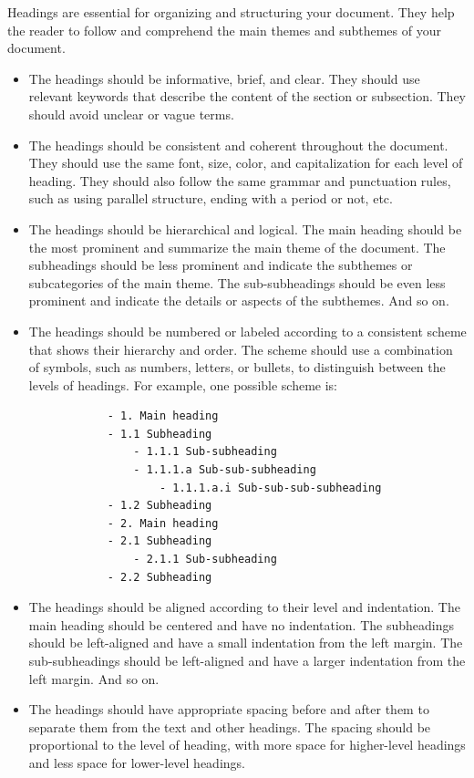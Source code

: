 \documentclass[12pt]{article}
\begin{document}
Headings are essential for organizing and structuring your document. They help the reader to follow and comprehend the main themes and subthemes of your document.

\begin{itemize}
    \item The headings should be informative, brief, and clear. They should use relevant keywords that describe the content of the section or subsection. They should avoid unclear or vague terms.
    \item The headings should be consistent and coherent throughout the document. They should use the same font, size, color, and capitalization for each level of heading. They should also follow the same grammar and punctuation rules, such as using parallel structure, ending with a period or not, etc.
    \item The headings should be hierarchical and logical. The main heading should be the most prominent and summarize the main theme of the document. The subheadings should be less prominent and indicate the subthemes or subcategories of the main theme. The sub-subheadings should be even less prominent and indicate the details or aspects of the subthemes. And so on.
    \item The headings should be numbered or labeled according to a consistent scheme that shows their hierarchy and order. The scheme should use a combination of symbols, such as numbers, letters, or bullets, to distinguish between the levels of headings. For example, one possible scheme is:

          \begin{verbatim}
            - 1. Main heading
            - 1.1 Subheading
                - 1.1.1 Sub-subheading
                - 1.1.1.a Sub-sub-subheading
                    - 1.1.1.a.i Sub-sub-sub-subheading
            - 1.2 Subheading
            - 2. Main heading
            - 2.1 Subheading
                - 2.1.1 Sub-subheading
            - 2.2 Subheading
          \end{verbatim}

    \item The headings should be aligned according to their level and indentation. The main heading should be centered and have no indentation. The subheadings should be left-aligned and have a small indentation from the left margin. The sub-subheadings should be left-aligned and have a larger indentation from the left margin. And so on.
    \item The headings should have appropriate spacing before and after them to separate them from the text and other headings. The spacing should be proportional to the level of heading, with more space for higher-level headings and less space for lower-level headings.
\end{itemize}
\end{document}

